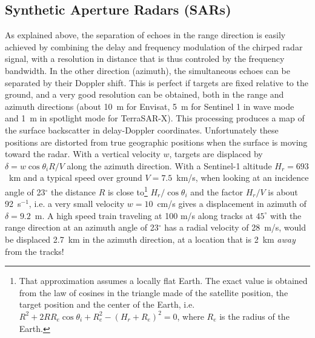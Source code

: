 


 \subsection{Synthetic Aperture Radars (SARs)}
As  explained above, the separation of echoes in the range direction is easily achieved by combining the delay and frequency modulation of 
the chirped radar signal, with a resolution in distance that is thus controled by the frequency bandwidth. 
In the other direction (azimuth), the simultaneous echoes can be separated by their Doppler shift. 
This is perfect if targets are fixed relative to the ground, and a 
very good resolution can be obtained, both in the range and azimuth directions (about 10~m for Envisat, 5~m for Sentinel 1 in wave mode and 1~m in spotlight mode for TerraSAR-X). This processing 
produces a  map of the surface 
backscatter in delay-Doppler coordinates. Unfortunately these positions are distorted from  true geographic positions when the surface is moving toward the 
radar. With a vertical velocity $w$, targets are displaced by $\delta=w \cos \theta_i  R/V$ along the azimuth direction. With a Sentinel-1 altitude $H_r = 693$~km  and a typical speed over ground $V=7.5$~km/s, when looking at an incidence angle of 23$^\circ$ the distance $R$ is close to\footnote{That approximation assumes a locally flat Earth. The exact value is obtained from the law of cosines in the triangle made of the satellite position, the target position and the center of the Earth, i.e. $R^2 + 2 R R_e \cos \theta_i +R_e^2 - (H_r +R_e)^2=0$, where $R_e$ is the radius of the Earth.} $H_r/\cos \theta_i$ and the 
factor $H_r/V$ is about 92~s$^{-1}$, i.e. a very small velocity  $w= 10$~cm/s gives a displacement in azimuth of $\delta=9.2$~m. 
A high speed train traveling at 100 m/s along tracks at $45^\circ$ with the range direction at an azimuth angle of 23$^\circ$ has a radial velocity of 28~m/s, would be displaced 2.7~km in the azimuth direction, at a location that is 2~km \textit{away} from the tracks!
%
%


